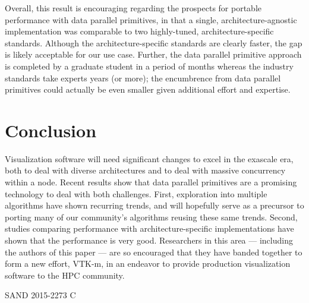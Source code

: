 \documentclass{superfri}
\begin{document}
Overall, this result is encouraging regarding the prospects for portable
performance with data parallel primitives, in that 
a single, architecture-agnostic implementation was comparable to two 
highly-tuned, architecture-specific standards.
%
Although the architecture-specific standards are clearly faster, the gap
is likely acceptable for our use case.
%
Further, the data parallel primitive approach is completed by a graduate
student in a period of months whereas the industry standards take
experts years (or more); the encumbrence from data parallel
primitives could actually be even smaller given additional effort and expertise.

\section{Conclusion}

\noindent
Visualization software will need significant changes to excel in
the exascale era, both to deal with diverse architectures and to 
deal with massive concurrency within a node.
%
Recent results show that data parallel primitives are a promising technology
to deal with both challenges.
%
First, exploration into multiple algorithms have shown recurring
trends, and will hopefully serve as a precursor to porting many of our
community's algorithms reusing these same trends.
%
Second, studies comparing performance with architecture-specific
implementations have shown that the performance is very good.
%
Researchers in this area --- including the authors of this paper ---
are so encouraged that they have banded together to form a new effort, 
VTK-m, in an endeavor to provide production visualization software
to the HPC community.


{\scriptsize SAND 2015-2273 C}




\end{document}
